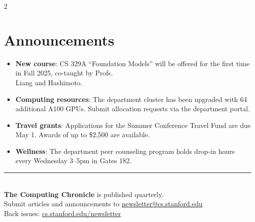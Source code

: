 \documentclass[10pt,a4paper]{article}
\begin{document}
\begin{multicols}{2}
\begin{center}
\end{center}

\section{Announcements}

\begin{itemize}[leftmargin=1.2em, itemsep=4pt]
  \item \textbf{New course}: CS 329A ``Foundation Models'' will be offered for the first time in Fall 2025, co-taught by Profs.\\ Liang and Hashimoto.
  \item \textbf{Computing resources}: The department cluster has been upgraded with 64 additional A100 GPUs. Submit allocation requests via the department portal.
  \item \textbf{Travel grants}: Applications for the Summer Conference Travel Fund are due May 1. Awards of up to \$2,500 are available.
  \item \textbf{Wellness}: The department peer counseling program holds drop-in hours every Wednesday 3--5pm in Gates 182.
\end{itemize}

\vspace{0.5cm}
\begin{center}
{\color{rulecolor}\rule{0.8\columnwidth}{0.5pt}}\\[6pt]
{\small\color{darktext}
\textbf{The Computing Chronicle} is published quarterly.\\
Submit articles and announcements to \href{mailto:newsletter@cs.stanford.edu}{newsletter@cs.stanford.edu}\\
Back issues: \href{https://cs.stanford.edu/newsletter}{cs.stanford.edu/newsletter}}
\end{center}

\end{multicols}
\end{document}
